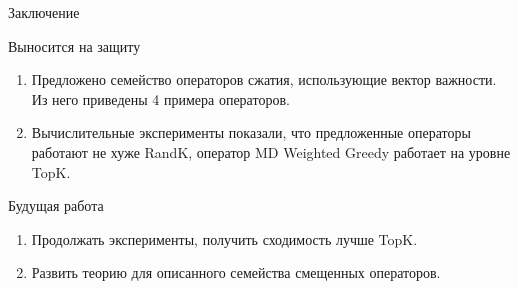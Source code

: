 \documentclass{beamer}
\begin{document}

\begin{frame}{Заключение}
    \begin{block}{Выносится на защиту}
    \begin{enumerate}
        \item Предложено семейство операторов сжатия, использующие вектор важности. Из него приведены 4 примера операторов.
        \item Вычислительные эксперименты показали, что предложенные операторы работают не хуже RandK, оператор MD Weighted Greedy работает на уровне TopK.
    \end{enumerate}
    \end{block}
    \begin{block}{Будущая работа}
    \begin{enumerate}
        \item Продолжать эксперименты, получить сходимость лучше TopK.
        \item Развить теорию для описанного семейства смещенных операторов.
    \end{enumerate}
    \end{block}

\end{frame}

\end{document}
